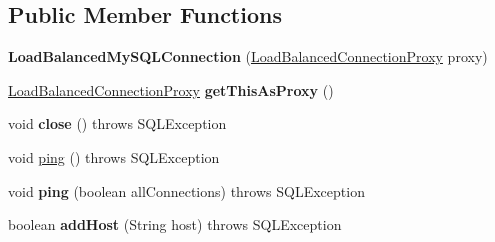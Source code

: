 \subsection*{Public Member Functions}
\begin{DoxyCompactItemize}
\item 
\mbox{\label{classcom_1_1mysql_1_1cj_1_1jdbc_1_1ha_1_1_load_balanced_my_s_q_l_connection_a818d820179932bd4115a4e8447b3fdec}} 
{\bfseries Load\+Balanced\+My\+S\+Q\+L\+Connection} (\mbox{\hyperlink{classcom_1_1mysql_1_1cj_1_1jdbc_1_1ha_1_1_load_balanced_connection_proxy}{Load\+Balanced\+Connection\+Proxy}} proxy)
\item 
\mbox{\label{classcom_1_1mysql_1_1cj_1_1jdbc_1_1ha_1_1_load_balanced_my_s_q_l_connection_af9de092f120ef290b55055372dea8a1a}} 
\mbox{\hyperlink{classcom_1_1mysql_1_1cj_1_1jdbc_1_1ha_1_1_load_balanced_connection_proxy}{Load\+Balanced\+Connection\+Proxy}} {\bfseries get\+This\+As\+Proxy} ()
\item 
\mbox{\label{classcom_1_1mysql_1_1cj_1_1jdbc_1_1ha_1_1_load_balanced_my_s_q_l_connection_aa5aadbcc364a3ca64c27a08166914f8f}} 
void {\bfseries close} ()  throws S\+Q\+L\+Exception 
\item 
void \mbox{\hyperlink{classcom_1_1mysql_1_1cj_1_1jdbc_1_1ha_1_1_load_balanced_my_s_q_l_connection_a58a06fe0caa8144988fb2464d9fc4b0a}{ping}} ()  throws S\+Q\+L\+Exception 
\item 
\mbox{\label{classcom_1_1mysql_1_1cj_1_1jdbc_1_1ha_1_1_load_balanced_my_s_q_l_connection_a62e8d4c1e4cea88eeb9b2c87d5f230c3}} 
void {\bfseries ping} (boolean all\+Connections)  throws S\+Q\+L\+Exception 
\item 
\mbox{\label{classcom_1_1mysql_1_1cj_1_1jdbc_1_1ha_1_1_load_balanced_my_s_q_l_connection_affe5003f09c7d3e9fba41cf93dbe77ad}} 
boolean {\bfseries add\+Host} (String host)  throws S\+Q\+L\+Exception 
\item 
\mbox{\label{classcom_1_1mysql_1_1cj_1_1jdbc_1_1ha_1_1_load_balanced_my_s_q_l_connection_aa6bab7fffe3955a425bbcf99174154c3}} 

\end{DoxyCompactItemize}
